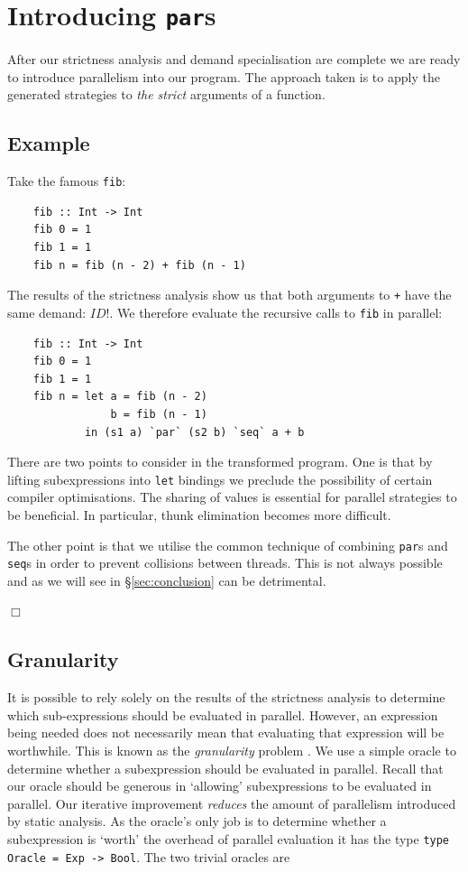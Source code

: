 %
%
\section{Introducing \texttt{par}s}
\label{sec:introPar}

After our strictness analysis and demand specialisation are complete we are
ready to introduce parallelism into our program. The approach taken is to apply
the generated strategies to \emph{the strict} arguments of a function. 

\subsection*{Example}

Take the famous \verb-fib-:

\begin{verbatim}
    fib :: Int -> Int
    fib 0 = 1
    fib 1 = 1
    fib n = fib (n - 2) + fib (n - 1)
\end{verbatim}

The results of the strictness analysis show us that both arguments to \verb-+-
have the same demand: $ID!$. We therefore evaluate the recursive
calls to \verb-fib- in parallel:

\begin{verbatim}
    fib :: Int -> Int
    fib 0 = 1
    fib 1 = 1
    fib n = let a = fib (n - 2)
                b = fib (n - 1)
            in (s1 a) `par` (s2 b) `seq` a + b
\end{verbatim}

There are two points to consider in the transformed program. One is that by lifting
subexpressions into \verb-let- bindings we preclude the possibility of certain compiler
optimisations. The sharing of values is essential for parallel strategies to be beneficial.
In particular, thunk elimination becomes more difficult.

The other point is that we utilise the common technique of combining \verb-par-s
and \verb-seq-s in order to prevent collisions between threads. This is not always
possible and as we will see in \S \ref{sec:conclusion} can be detrimental.

\hfill$\Box$

\subsection{Granularity}

It is possible to rely solely on the results of the strictness analysis to
determine which sub-expressions should be evaluated in parallel. However, an
expression being needed does not necessarily mean that evaluating that
expression will be worthwhile. This is known as the \emph{granularity} problem
\citep{hammond2000research}. We use a simple oracle to determine whether a
subexpression should be evaluated in parallel. Recall that our oracle should be
generous in `allowing' subexpressions to be evaluated in parallel. Our
iterative improvement \emph{reduces} the amount of parallelism introduced by
static analysis. As the oracle's only job is to determine whether a
subexpression is `worth' the overhead of parallel evaluation it has the type
\verb+type Oracle = Exp -> Bool+. The two trivial oracles are

